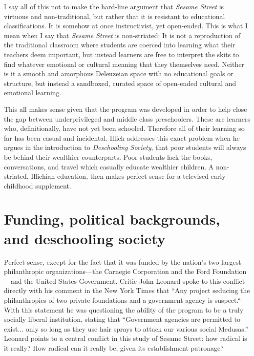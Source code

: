 \documentclass[12pt,letterpaper]{article}
\begin{document}
	I say all of this not to make the hard-line argument that \textit{Sesame
	Street} is virtuous and non-traditional, but rather that it is  
	resistant to educational classifications.
	It is somehow at once instructivist, yet open-ended. This
	is what I mean when I say that \textit{Sesame Street} is non-striated: 
	It is not a reproduction of the traditional classroom where students are
	coerced into learning what their teachers deem important, but instead 
	learners are free to interpret the skits to find whatever emotional or 
	cultural meaning that they themselves need. Neither is it a smooth 
	and amorphous Deleuzeian space with no educational goals or structure, 
	but 
	instead a sandboxed, curated space of open-ended cultural and 
	emotional learning.

	This all makes sense given that the program was developed in order to 
	help close the gap between underprivileged and middle class 
	preschoolers\autocite[sec. 1]{Cooney}. These are learners who, 
	definitionally, have not yet been schooled. Therefore all of their 
	learning so far has been casual and incidental. Illich addresses this 
	exact problem when he argues in the introduction to \textit{Deschooling
	Society}, that poor students will always be behind their wealthier
	counterparts\autocite[5]{Illich}. Poor students lack the books, 
	conversations, and travel which casually educate wealthier children.
	A non-striated, Illichian education, then makes perfect sense for
	a televised early-childhood supplement.

	\section*{Funding, political backgrounds, and deschooling society}

	Perfect sense, except for the fact that it was funded by the nation’s 
	two largest philanthropic organizations—the Carnegie Corporation and 
	the Ford Foundation—and the United States Government. Critic John 
	Leonard spoke to this conflict directly with his comment in the New 
	York Times that ``Any project seducing the philanthropies of two private
	foundations and a government agency is suspect.``
	With this statement he was questioning the ability of the program to be
	a truly socially liberal institution, stating that ``Government agencies
	are permitted to exist... only so long as they use hair sprays to 
	attack our various social Medusas.'' \autocite[146]{Davis} Leonard 
	points to a central conflict in this study of Sesame Street: how radical
	is it really? How radical can it really be, given its establishment 
	patronage?
\end{document}
